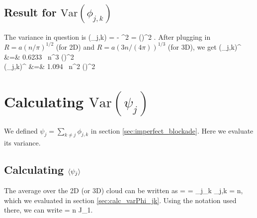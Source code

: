 \subsection{Result for $\mathrm{Var}(\phi_{j,k})$}
The variance in question is
\bel
	(\phi_{j,k}) =  - ^2
	= \left(\right)^2 \left[J_2 - J_1^2\right].
\eel
After plugging in $R = a (n/\pi)^{1/2}$ (for 2D) and $R = a (3n/(4\pi))^{1/3}$
(for 3D), we get
\bal
\label{eq:Var_phi_jk_2D}
	(\phi_{j,k})^ &=& 0.6233 \, n^3
	\left(\right)^2
	\\
\label{eq:Var_phi_jk_3D}
	(\phi_{j,k})^ &=& 1.094 \, n^2
	\left(\right)^2
\eal

\section{Calculating $\mathrm{Var}(\psi_j)$}
\label{sec:calc_varPsi_j}
We defined $\psi_j = \sum_{k\neq j} \phi_{j,k}$ in section
\ref{sec:imperfect_blockade}. Here we evaluate its variance.

\subsection{Calculating $\left< \psi_j \right>$}
The average over the 2D (or 3D) cloud can be written as
\bal
	 =  = \sum_j\sum_k \phi_{j,k} =
	n,
\eal
which we evaluated in section \ref{sec:calc_varPhi_jk}. Using the notation used
there, we can write
\bel
	 = n J_1. 
\eel

